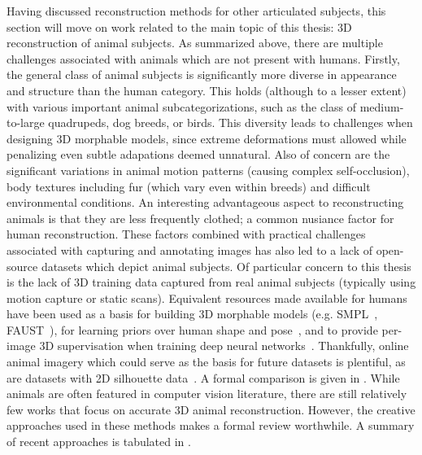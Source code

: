     Having discussed reconstruction methods for other articulated subjects, this section will move on work related to the main topic of this thesis: 3D reconstruction of animal subjects. As summarized above, there are multiple challenges associated with animals which are not present with humans. Firstly, the general class of animal subjects is significantly more diverse in appearance and structure than the human category. This holds (although to a lesser extent) with various important animal subcategorizations, such as the class of medium-to-large quadrupeds, dog breeds, or birds. This diversity leads to challenges when designing 3D morphable models, since extreme deformations must allowed while penalizing even subtle adapations deemed unnatural. Also of concern are the significant variations in animal motion patterns (causing complex self-occlusion), body textures including fur (which vary even within breeds) and difficult environmental conditions. An interesting advantageous aspect to reconstructing animals is that they are less frequently clothed; a common nusiance factor for human reconstruction. These factors combined with practical challenges associated with capturing and annotating images has also led to a lack of open-source datasets which depict animal subjects. Of particular concern to this thesis is the lack of 3D training data captured from real animal subjects (typically using motion capture or static scans). Equivalent resources made available for humans have been used as a basis for building 3D morphable models (e.g. SMPL~\cite{loper15smpl}, FAUST~), for learning priors over human shape and pose~, and to provide per-image 3D supervisation when training deep neural networks~\cite{kanazawa18end-to-end}. Thankfully, online animal imagery which could serve as the basis for future datasets is plentiful, as are datasets with 2D silhouette data~\cite{lin2014microsoft,everingham2010pascal,DAVIS2017-2nd}. A formal comparison is given in .  While animals are often featured in computer vision literature, there are still relatively few works that focus on accurate 3D animal reconstruction. However, the creative approaches used in these methods makes a formal review worthwhile. A summary of recent approaches is tabulated in .
    
    

    

